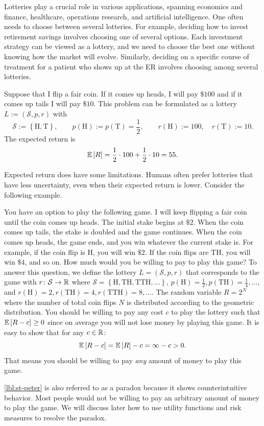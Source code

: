\documentclass[letterpaper,11pt]{article}
\begin{document}
Lotteries play a crucial role in various applications, spanning economics and finance, healthcare, operations research, and artificial intelligence. One often needs to choose between several lotteries. For example, deciding how to invest retirement savings involves choosing one of several options. Each investment strategy can be viewed as a lottery, and we need to choose the best one without knowing how the market will evolve. Similarly, deciding on a specific course of treatment for a patient who shows up at the ER involves choosing among several lotteries. 
\begin{example}
Suppose that I flip a fair coin. If it comes up heads, I will pay $\$100$ and if it comes up tails I will pay $\$10$. This problem can be formulated as a lottery $L := (\mathcal{S}, p, r)$ with 
  \[
    \mathcal{S} := \left\{ \mathrm{H}, \mathrm{T} \right\},
    \qquad
    p(\mathrm{H}) := p(\mathrm{T}) = \frac{1}{2},
    \qquad
    r(\mathrm{H}) := 100,
    \quad
    r(\mathrm{T}) := 10. 
  \]
  The expected return is
  \[
   \mathbb{E}\left[ R \right] = \frac{1}{2} \cdot 100 + \frac{1}{2} \cdot 10 = 55.  
  \]
\end{example}

Expected return does have some limitations. Humans often prefer lotteries that have less uncertainty, even when their expected return is lower. Consider the following example.
\begin{example} \label{lbl:st-peter}
  You have an option to play the following game. I will keep flipping a fair coin until the coin comes up heads. The initial stake begins at $\$2$. When the coin comes up tails, the stake is doubled and the game continues. When the coin comes up heads, the game ends, and you win whatever the current stake is. For example, if the coin flip is $\mathrm{H}$, you will win $\$2$. If the coin flips are $\mathrm{TH}$, you will win $\$4$, and so on. How much would you be willing to pay to play this game? To answer this question, we define the lottery $L = (\mathcal{S}, p,r)$ that corresponds to the game with $r \colon \mathcal{S} \to \mathbb{R}$ where $\mathcal{S} = \left\{ \mathrm{H}, \mathrm{TH}, \mathrm{TTH}, \dots  \right\}$, $p(\mathrm{H}) = \frac{1}{2}, p(\mathrm{TH}) = \frac{1}{4}, \dots $, and $r(\mathrm{H}) = 2, r(\mathrm{TH}) = 4, r(\mathrm{TTH}) = 8, \dots $. The random variable $R = 2^{N}$ where the number of total coin flips $N$ is distributed according to the geometric distribution. You should be willing to pay any cost $c$ to play the lottery such that $\mathbb{E}\left[ R - c \right] \ge 0$ since on average you will not lose money by playing this game. It is easy to show that for any $c \in \mathbb{R}$:
  \[
    \mathbb{E}\left[ R - c \right]  = \mathbb{E}\left[ R \right] - c = \infty - c > 0.
  \]
That means you should be willing to pay \emph{any} amount of money to play this game.
\end{example}
\cref{lbl:st-peter} is also referred to as a paradox because it shows counterintuitive behavior. Most people would not be willing to pay an arbitrary amount of money to play the game. We will discuss later how to use utility functions and risk measures to resolve the paradox.



\end{document}
